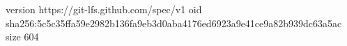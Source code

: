 version https://git-lfs.github.com/spec/v1
oid sha256:5c5c35ffa59e2982b136fa9eb3d0aba4176ed6923a9e41ce9a82b939dc63a5ac
size 604
